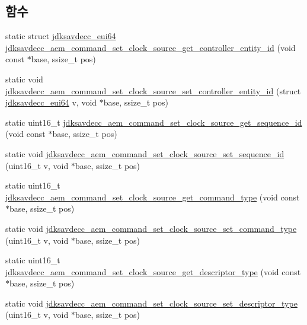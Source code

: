 \subsection*{함수}
\begin{DoxyCompactItemize}
\item 
static struct \hyperlink{structjdksavdecc__eui64}{jdksavdecc\+\_\+eui64} \hyperlink{group__command__set__clock__source_gaf660fe37452090247a8a9692811a5925}{jdksavdecc\+\_\+aem\+\_\+command\+\_\+set\+\_\+clock\+\_\+source\+\_\+get\+\_\+controller\+\_\+entity\+\_\+id} (void const $\ast$base, ssize\+\_\+t pos)
\item 
static void \hyperlink{group__command__set__clock__source_ga858d16c7ae99cdfb398898e9a2e39a43}{jdksavdecc\+\_\+aem\+\_\+command\+\_\+set\+\_\+clock\+\_\+source\+\_\+set\+\_\+controller\+\_\+entity\+\_\+id} (struct \hyperlink{structjdksavdecc__eui64}{jdksavdecc\+\_\+eui64} v, void $\ast$base, ssize\+\_\+t pos)
\item 
static uint16\+\_\+t \hyperlink{group__command__set__clock__source_ga4116ce8734ff8eaa478b39e58fa80570}{jdksavdecc\+\_\+aem\+\_\+command\+\_\+set\+\_\+clock\+\_\+source\+\_\+get\+\_\+sequence\+\_\+id} (void const $\ast$base, ssize\+\_\+t pos)
\item 
static void \hyperlink{group__command__set__clock__source_ga013876e6d6a2ab3a0bee3aecd807093d}{jdksavdecc\+\_\+aem\+\_\+command\+\_\+set\+\_\+clock\+\_\+source\+\_\+set\+\_\+sequence\+\_\+id} (uint16\+\_\+t v, void $\ast$base, ssize\+\_\+t pos)
\item 
static uint16\+\_\+t \hyperlink{group__command__set__clock__source_ga5d3196cd06558dfea0059df004748cec}{jdksavdecc\+\_\+aem\+\_\+command\+\_\+set\+\_\+clock\+\_\+source\+\_\+get\+\_\+command\+\_\+type} (void const $\ast$base, ssize\+\_\+t pos)
\item 
static void \hyperlink{group__command__set__clock__source_ga3ea335fc1d6469b98720d78ec22139db}{jdksavdecc\+\_\+aem\+\_\+command\+\_\+set\+\_\+clock\+\_\+source\+\_\+set\+\_\+command\+\_\+type} (uint16\+\_\+t v, void $\ast$base, ssize\+\_\+t pos)
\item 
static uint16\+\_\+t \hyperlink{group__command__set__clock__source_ga590f85258fbf9f90a98af06cbe9e9cb1}{jdksavdecc\+\_\+aem\+\_\+command\+\_\+set\+\_\+clock\+\_\+source\+\_\+get\+\_\+descriptor\+\_\+type} (void const $\ast$base, ssize\+\_\+t pos)
\item 
static void \hyperlink{group__command__set__clock__source_ga9c97f2bc1c596cac06f216d107787ca1}{jdksavdecc\+\_\+aem\+\_\+command\+\_\+set\+\_\+clock\+\_\+source\+\_\+set\+\_\+descriptor\+\_\+type} (uint16\+\_\+t v, void $\ast$base, ssize\+\_\+t pos)

\end{DoxyCompactItemize}
